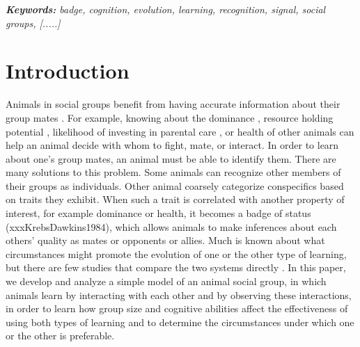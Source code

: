 \textit{\textbf{Keywords:} badge, cognition, evolution, learning, recognition, signal, social groups,  [.....]}

\newpage
\section*{Introduction} 
Animals in social groups benefit from having accurate information about their group mates \cite{Seyfarth:2010bh}. For example, knowing about the dominance \cite{Hobson:2015kx,Hobson:2015uq,Flack:2006fk,Brush:2013fk,Flack:2006uq,Cowlishaw:1990vn,Waal:1986ys,Seyfarth:2005ve,Bergman:2003qf}, resource holding potential \cite{Arnott:2009zr,Lemel:1993ve,Dick:1990cr,Rhijn:1980uq,Freeman:1985kl}, likelihood of investing in parental care \cite{Olsen:2010uq,Qvarnstrom:1997fk}, or health \cite{Folstad:1992kx,Loyau:2005nx} of other animals can help an animal decide with whom to fight, mate, or interact. In order to learn about one's group mates, an animal must be able to identify them. There are many solutions to this problem. Some animals can recognize other members of their groups as individuals. Other animal coarsely categorize conspecifics based on traits they exhibit. When such a trait is correlated with another property of interest, for example dominance or health, it becomes a badge of status (xxxKrebsDawkins1984), which allows animals to make inferences about each others' quality as mates or opponents or allies. Much is known about what circumstances might promote the evolution of one or the other type of learning, but there are few studies that compare the two systems directly \cite{sheehan2016evotradeoff}. In this paper, we develop and analyze a simple model of an animal social group, in which animals learn by interacting with each other and by observing these interactions, in order to learn how group size and cognitive abilities affect the effectiveness of using both types of learning and to determine the circumstances under which one or the other is preferable. 

